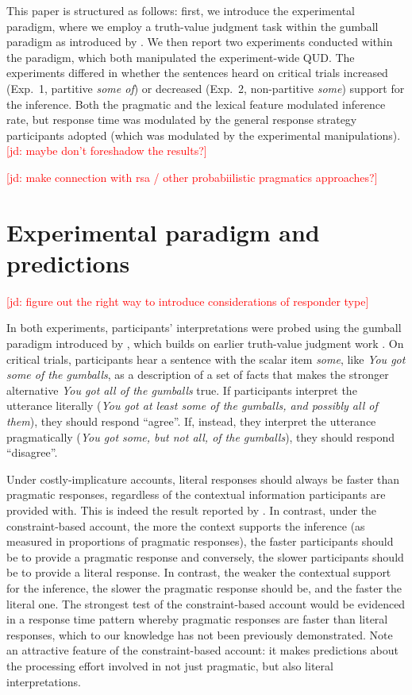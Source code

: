 \documentclass[10pt,letterpaper]{article}
\newcommand{\jd}[1]{\textcolor{Red}{[jd: #1]}}
\begin{document}
This paper is structured as follows: first, we introduce the experimental paradigm, where we employ a truth-value judgment task within the gumball paradigm as introduced by . We then report two experiments conducted within the paradigm, which both manipulated the experiment-wide QUD. The experiments differed in whether the sentences heard on critical trials increased (Exp.~1, partitive \emph{some of}) or decreased (Exp.~2, non-partitive \emph{some}) support for the inference. Both the pragmatic and the lexical feature modulated inference rate, but response time was modulated by the general response strategy participants adopted (which was modulated by the experimental manipulations).\jd{maybe don't foreshadow the results?}

\jd{make connection with rsa / other probabiilistic pragmatics approaches?}

\section{Experimental paradigm and predictions}

\jd{figure out the right way to introduce considerations of responder type} 

In both experiments, participants' interpretations were probed using the gumball paradigm introduced by , which builds on earlier truth-value judgment work \cite{BottNoveck2004}. On critical trials, participants hear a sentence with the scalar item \emph{some}, like \emph{You got some of the gumballs}, as a description of a set of facts that makes the stronger alternative \emph{You got all of the gumballs} true. If participants interpret the utterance literally (\emph{You got at least some of the gumballs, and possibly all of them}), they should respond ``agree''. If, instead, they interpret the utterance pragmatically (\emph{You got some, but not all, of the gumballs}), they should respond ``disagree''. 

Under costly-implicature accounts, literal responses should always be faster than pragmatic responses, regardless of the contextual information participants are provided with. This is indeed the result reported by . In contrast, under the constraint-based account, the more the context supports the inference (as measured in proportions of pragmatic responses), the faster participants should be to provide a pragmatic response and conversely, the slower participants should be to provide a literal response. In contrast, the weaker the contextual support for the inference, the slower the pragmatic response should be, and the faster the literal one. The strongest test of the constraint-based account would be evidenced in a response time pattern whereby pragmatic responses are faster than literal responses, which to our knowledge has not been previously demonstrated. Note an attractive feature of the constraint-based account: it makes predictions about the processing effort involved in not just pragmatic, but also literal interpretations.
\end{document}
